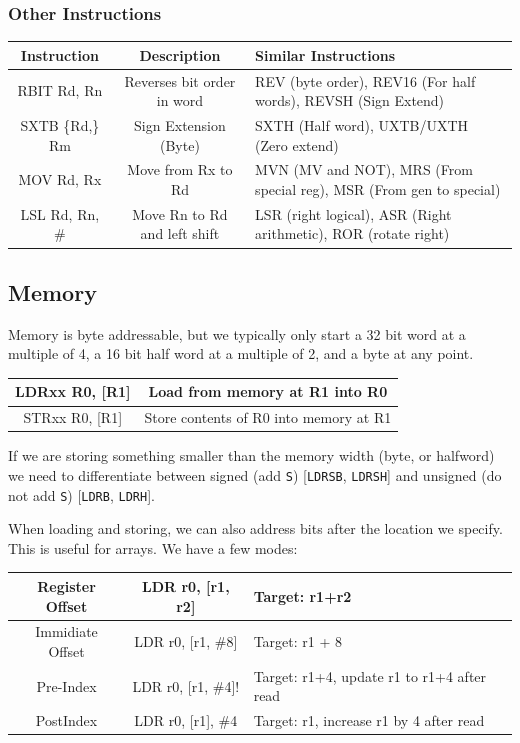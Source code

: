 \documentclass[12pt,letterpaper]{article} \usepackage{amsmath} \usepackage{graphicx} \usepackage[margin=1in]{geometry} \usepackage{longtable}  \usepackage{amssymb}
\begin{document}
	\subsubsection{Other Instructions}
	
	\begin{center}
		\begin{tabular}{|c|c|p{7cm}|}
			\hline
			Instruction & Description & Similar Instructions \\
			\hline\hline
			RBIT Rd, Rn & Reverses bit order in word & REV (byte order), REV16 (For half words), REVSH (Sign Extend) \\
			\hline
			SXTB \{Rd,\} Rm & Sign Extension (Byte) & SXTH (Half word), UXTB/UXTH (Zero extend) \\
			\hline
			MOV Rd, Rx & Move from Rx to Rd & MVN (MV and NOT), MRS (From special reg), MSR (From gen to special) \\
			\hline
			LSL Rd, Rn, \# & Move Rn to Rd and left shift & LSR (right logical), ASR (Right arithmetic), ROR (rotate right) \\
			\hline
		\end{tabular}
	\end{center}
	
	
	\subsection{Memory}
	Memory is byte addressable, but we typically only start a 32 bit word at a multiple of 4, a 16 bit half word at a multiple of 2, and a byte at any point. 
	
	\begin{center}
		\begin{tabular}{|c|c|}
			\hline
			LDRxx R0, [R1] & Load from memory at R1 into R0 \\
			\hline
			STRxx R0, [R1] & Store contents of R0 into memory at R1 \\
			\hline
		\end{tabular}
	\end{center}
	
	If we are storing something smaller than the memory width (byte, or halfword) we need to differentiate between signed (add \verb*|S|) [\verb*|LDRSB|, \verb*|LDRSH|] and unsigned (do not add \verb|S|) [\verb*|LDRB|, \verb*|LDRH|].
	
	When loading and storing, we can also address bits after the location we specify. This is useful for arrays. We have a few modes:
	\begin{center}
		\begin{tabular}{|c|c|l|}
			\hline
			Register Offset & LDR r0, [r1, r2] & Target: r1+r2 \\
			\hline
			Immidiate Offset & LDR r0, [r1, \#8] & Target: r1 + 8 \\
			\hline
			Pre-Index & LDR r0, [r1, \#4]! & Target: r1+4, update r1 to r1+4 after read \\
			\hline
			PostIndex & LDR r0, [r1], \#4 & Target: r1, increase r1 by 4 after read \\
			\hline
		\end{tabular}
	\end{center}
	
\end{document}
